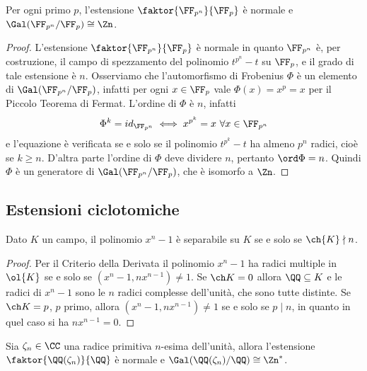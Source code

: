 \documentclass[11pt]{scrartcl}
\begin{document}
	\begin{theorem}
		Per ogni primo $p$, l'estensione $\faktor{\FF_{p^n}}{\FF_p}$ è normale e 
		$\Gal(\FF_{p^n}/\FF_p) \cong \Zn$.
	\end{theorem}
	
	\begin{proof}
		L'estensione $\faktor{\FF_{p^n}}{\FF_p}$ è normale in quanto $\FF_{p^n}$
		è, per costruzione, il campo di spezzamento del polinomio $t^{p^n} - t$
		su $\FF_p$, e il grado di tale estensione è $n$. Osserviamo che l'automorfismo
		di Frobenius $\Phi$ è un elemento di $\Gal(\FF_{p^n}/\FF_p)$, infatti 
		per ogni $x \in \FF_p$ vale $\Phi(x) = x^p = x$ per il Piccolo Teorema di Fermat.
		L'ordine di $\Phi$ è $n$, infatti 
		\[
		\Phi^k = id_{\FF_{p^n}} \iff x^{p^k} = x~\forall x \in \FF_{p^n}
		\]
		e l'equazione è verificata se e solo se il polinomio $t^{p^k} - t$ ha almeno
		$p^n$ radici, cioè se $k \geq n$. D'altra parte l'ordine di $\Phi$ deve 
		dividere $n$, pertanto $\ord\Phi = n$. Quindi $\Phi$ è un generatore 
		di $\Gal(\FF_{p^n}/\FF_p)$, che è isomorfo a $\Zn$.
	\end{proof}
	
	\subsection{Estensioni ciclotomiche}
	
	\begin{lemma}
		\label{lemma3.8}
		Dato $K$ un campo, il polinomio $x^n - 1$ è separabile su $K$ se e solo 
		se $\ch{K} \nmid n$.
	\end{lemma}
	
	\begin{proof}
		Per il Criterio della Derivata il polinomio $x^n - 1$ ha radici multiple
		in $\ol{K}$ se e solo se $(x^n - 1, nx^{n - 1}) \neq 1$. Se $\ch K = 0$
		allora $\QQ\subseteq K$ e le radici di 
		$x^n - 1$ sono le $n$ radici complesse dell'unità, che sono tutte distinte.
		Se $\ch K = p$, $p$ primo, allora $(x^n - 1, nx^{n - 1}) \neq 1$ se e solo
		se $p \mid n$, in quanto in quel caso si ha $nx^{n - 1} = 0$.
	\end{proof}
	
	\begin{theorem}
		\label{teorema3.9}
		Sia $\zeta_n\in \CC$ una radice primitiva $n$-esima dell'unità, allora
		l'estensione $\faktor{\QQ(\zeta_n)}{\QQ}$ è normale e 
		$\Gal(\QQ(\zeta_n)/\QQ)\cong \Zn^*$.
	\end{theorem}
	
\end{document}
